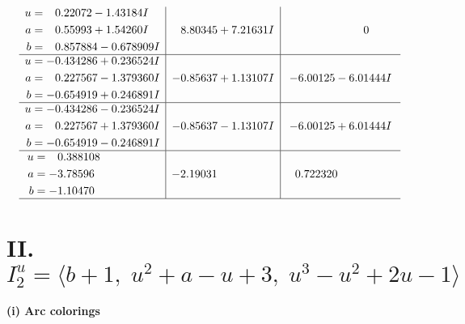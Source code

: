 \documentclass[1p]{elsarticle_modified}
\theoremstyle{definition}
\begin{document}
$$\begin{array}{c|c|c}
\begin{aligned}
u &= \phantom{-}0.22072 - 1.43184 I \\
a &= \phantom{-}0.55993 + 1.54260 I \\
b &= \phantom{-}0.857884 - 0.678909 I\end{aligned}
 & \phantom{-}8.80345 + 7.21631 I & \phantom{-0.000000 } 0 \\ \hline\begin{aligned}
u &= -0.434286 + 0.236524 I \\
a &= \phantom{-}0.227567 - 1.379360 I \\
b &= -0.654919 + 0.246891 I\end{aligned}
 & -0.85637 + 1.13107 I & -6.00125 - 6.01444 I \\ \hline\begin{aligned}
u &= -0.434286 - 0.236524 I \\
a &= \phantom{-}0.227567 + 1.379360 I \\
b &= -0.654919 - 0.246891 I\end{aligned}
 & -0.85637 - 1.13107 I & -6.00125 + 6.01444 I \\ \hline\begin{aligned}
u &= \phantom{-}0.388108\phantom{ +0.000000I} \\
a &= -3.78596\phantom{ +0.000000I} \\
b &= -1.10470\phantom{ +0.000000I}\end{aligned}
 & -2.19031\phantom{ +0.000000I} & \phantom{-}0.722320\phantom{ +0.000000I}\\
 \hline 
 \end{array}$$\newpage\newpage\renewcommand{\arraystretch}{1}
\centering \section*{II. $I^u_{2}= \langle b+1,\;u^2+a- u+3,\;u^3- u^2+2 u-1 \rangle$}
\flushleft \textbf{(i) Arc colorings}\\
\end{document}
